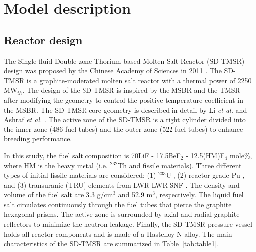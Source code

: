 \section{Model description} \label{Model-description}
\subsection{Reactor design}

The Single-fluid Double-zone Thorium-based Molten Salt Reactor (SD-TMSR) design was proposed by the Chinese Academy of Sciences in 2011 
\cite{li_optimization_2018,jiang2012advanced,li2015analysis,li2017model}. The \gls{SD-TMSR} is a graphite-moderated molten salt reactor with a thermal power of 2250 MW$_{th}$. The 
design of the \gls{SD-TMSR} is inspired by the \gls{MSBR} 
\cite{robertson_conceptual_1971} and the \gls{TMSR} \cite{nuttin2005potential} after modifying the geometry to 
control the positive temperature coefficient in the MSBR. The \gls{SD-TMSR} core 
geometry is described in detail by Li \emph{et al.} and Ashraf \emph{et al.}
\cite{li_optimization_2018,ashraf2019whole_core}. The active zone of the \gls{SD-TMSR} is a right cylinder divided into the inner zone (486 fuel tubes) and the outer zone (522 fuel tubes) to enhance breeding performance.

In this study, the fuel salt composition is 70LiF - 17.5BeF$_2$ - 12.5(HM)F$_4$ mole\%, where HM is the heavy metal (i.e. $^{232}$Th and fissile materials). Three different types of initial fissile materials are considered: (1) $^{233}$U \cite{ashraf2019whole_core}, (2) reactor-grade Pu \cite{marka1993explosive}, and (3) transuranic (TRU) elements from \gls{LWR} LWR \gls{SNF} \cite{de2000scenarios}.
The density and volume of the fuel salt are 3.3 g/cm$^{3}$ and 52.9 m$^3$, respectively.
The liquid fuel salt circulates continuously through the fuel tubes that pierce the graphite hexagonal 
prisms. The active zone is surrounded by axial and radial graphite reflectors to minimize the neutron leakage. Finally, the \gls{SD-TMSR} pressure vessel holds all reactor components and is made of a Hastelloy N alloy. The main 
characteristics of the \gls{SD-TMSR} are summarized in Table~\ref{tab:table1}.


